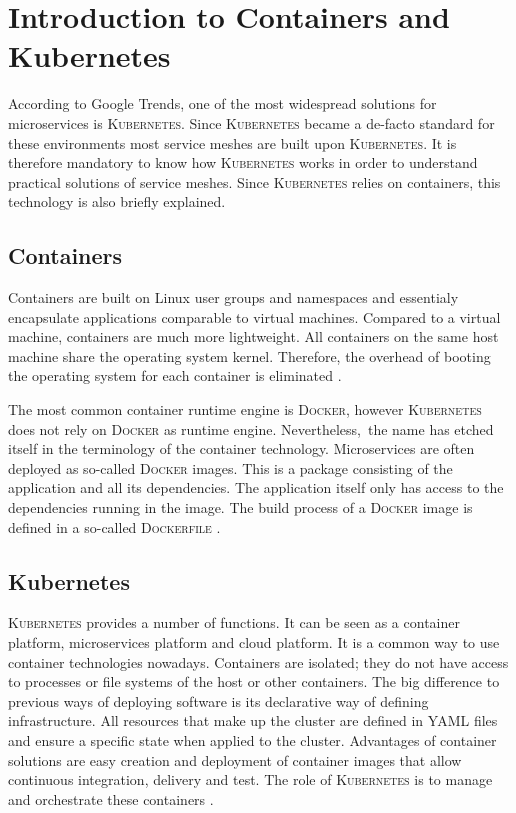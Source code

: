 \section{Introduction to Containers and Kubernetes}

According to Google Trends, one of the most widespread solutions for microservices is \textsc{Kubernetes}.
Since \textsc{Kubernetes} became a de-facto standard for these environments most service meshes are built upon \textsc{Kubernetes}. It is therefore mandatory to know how \textsc{Kubernetes} works in order to understand practical solutions of service meshes. Since \textsc{Kubernetes} relies on containers, this technology is also briefly explained.

\subsection{Containers}

Containers are built on Linux user groups and namespaces and essentialy encapsulate applications comparable to virtual machines. Compared to a virtual machine, containers are much more lightweight. All containers on the same host machine share the operating system kernel. Therefore, the overhead of booting the operating system for each container is eliminated \cite[p. 220 ff.]{sm3}.

The most common container runtime engine is \textsc{Docker}, however \textsc{Kubernetes} does not rely on \textsc{Docker} as runtime engine. Nevertheless, the name has etched itself in the terminology of the container technology. Microservices are often deployed as so-called \textsc{Docker} images. This is a package consisting of the application and all its dependencies. The application itself only has access to the dependencies running in the image. The build process of a \textsc{Docker} image is defined in a so-called \textsc{Dockerfile} \cite[p. 224]{sm3}.

\subsection{Kubernetes}

\textsc{Kubernetes} provides a number of functions. It can be seen as a container platform, microservices platform and cloud platform.
It is a common way to use container technologies nowadays. Containers are isolated; they do not have access to processes or file systems of the host or other containers. The big difference to previous ways of deploying software is its declarative way of defining infrastructure. All resources that make up the cluster are defined in YAML files and ensure a specific state when applied to the cluster.
Advantages of container solutions are easy creation and deployment of container images that allow continuous integration, delivery and test. The role of \textsc{Kubernetes} is to manage and orchestrate these containers \cite{k8s}.

